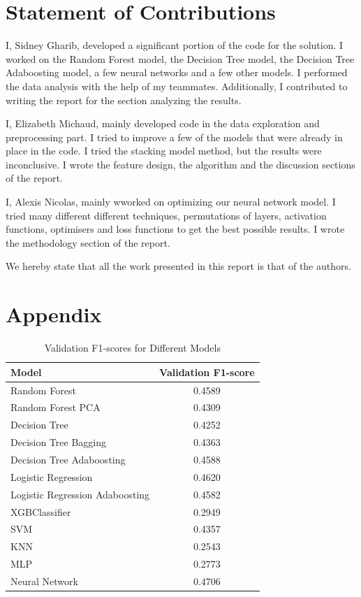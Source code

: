 \documentclass{article} %
\begin{document}
\section{Statement of Contributions}
\label{others}

I, Sidney Gharib, developed a significant portion of the code for the solution.
I worked on the Random Forest model, the Decision Tree model, the Decision Tree Adaboosting model, a few neural networks and a few other models.
I performed the data analysis with the help of my teammates. Additionally, I contributed to writing the report for the section analyzing the results.

I, Elizabeth Michaud, mainly developed code in the data exploration and preprocessing part. I tried to improve a few of the models that were already 
in place in the code. I tried the stacking model method, but the results were inconclusive. I wrote the feature design, the algorithm and the discussion 
sections of the report. 

I, Alexis Nicolas, mainly wworked on optimizing our neural network model.
I tried many different different techniques, permutations of layers, activation functions, optimisers and loss functions
to get the best possible results.
I wrote the methodology section of the report.

We hereby state that all the work presented in this report is that of the authors.

\appendix
\section{Appendix}

\begin{table}[ht!]
    \centering
    \begin{tabular}{|l|c|}
        \hline
        \textbf{Model} & \textbf{Validation F1-score} \\ \hline
        Random Forest & 0.4589 \\ \hline
        Random Forest PCA & 0.4309 \\ \hline
        Decision Tree & 0.4252 \\ \hline
        Decision Tree Bagging & 0.4363 \\ \hline
        Decision Tree Adaboosting & 0.4588 \\ \hline
        Logistic Regression & 0.4620 \\ \hline
        Logistic Regression Adaboosting & 0.4582 \\ \hline
        XGBClassifier & 0.2949 \\ \hline
        SVM & 0.4357 \\ \hline
        KNN & 0.2543 \\ \hline
        MLP & 0.2773 \\ \hline
        Neural Network & 0.4706 \\ \hline
    \end{tabular}
    \caption{Validation F1-scores for Different Models }
    \label{tab:validation-F1-scores}
\end{table}
\end{document}
